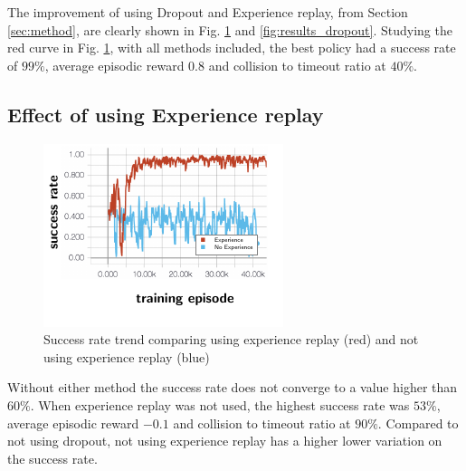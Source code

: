 The improvement of using Dropout and Experience replay, from Section \ref{sec:method}, are clearly shown in Fig. \ref{fig:results_experience} and \ref{fig:results_dropout}. Studying the red curve in Fig. \ref{fig:results_experience}, with all methods included, the best policy had a success rate of $99\%$, average episodic reward $0.8$ and collision to timeout ratio at $40\%$. 

\subsection{Effect of using Experience replay}
\begin{figure}[!h]
	\centering
	\includegraphics[width=0.7\columnwidth]{figures/figures-experience.pdf}
	\vspace{-0.5cm}
	\caption{Success rate trend comparing using experience replay (red) and not using experience replay (blue)}
	\label{fig:results_experience}
\end{figure}
Without either method the success rate does not converge to a value higher than $60\%$. When experience replay was not used, the highest success rate was $53\%$, average episodic reward $-0.1$ and collision to timeout ratio at $90\%$. Compared to not using dropout, not using experience replay has a higher lower variation on the success rate. 

